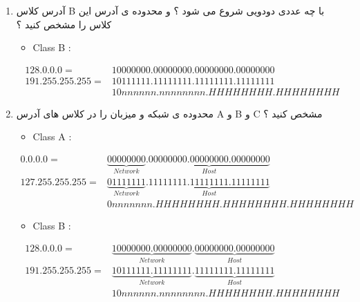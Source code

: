 \documentclass{article}
\begin{document}
\begin{enumerate}
\newpage

\item آدرس کلاس B با چه عددی دودویی شروع می شود ؟ و محدوده ی آدرس این کلاس را مشخص کنید ؟


\begin{tcolorbox}
\begin{latin}
\begin{itemize}
	\item Class B :
\end{itemize}
\end{latin}
\begin{align*}
128.  0.  0.  0 = &10000000.00000000.00000000.00000000 \\
191.255.255.255 = &10111111.11111111.11111111.11111111 \\
                  &10nnnnnn.nnnnnnnn.HHHHHHHH.HHHHHHHH
\end{align*}
\end{tcolorbox}


\item محدوده ی شبکه و میزبان را در کلاس های آدرس A و B و C مشخص کنید ؟


\begin{tcolorbox}
\begin{latin}
\begin{itemize}
	\item Class A :
\end{itemize}
\end{latin}
\begin{align*}
 0.  0.  0.  0 = &\underbrace{00000000}_{Network}.\underbrace{00000000.00000000.00000000}_{Host} \\
127.255.255.255 = &\underbrace{01111111}_{Network}.\underbrace{11111111.11111111.11111111}_{Host} \\
                  &0nnnnnnn.HHHHHHHH.HHHHHHHH.HHHHHHHH
\end{align*}



\begin{latin}
\begin{itemize}
	\item Class B :
\end{itemize}
\end{latin}
\begin{align*}
128.  0.  0.  0 = &\underbrace{10000000.00000000}_{Network}.\underbrace{00000000.00000000}_{Host} \\
191.255.255.255 = &\underbrace{10111111.11111111}_{Network}.\underbrace{11111111.11111111}_{Host} \\
                  &10nnnnnn.nnnnnnnn.HHHHHHHH.HHHHHHHH
\end{align*}



\end{tcolorbox}
\end{enumerate}
\end{document}

